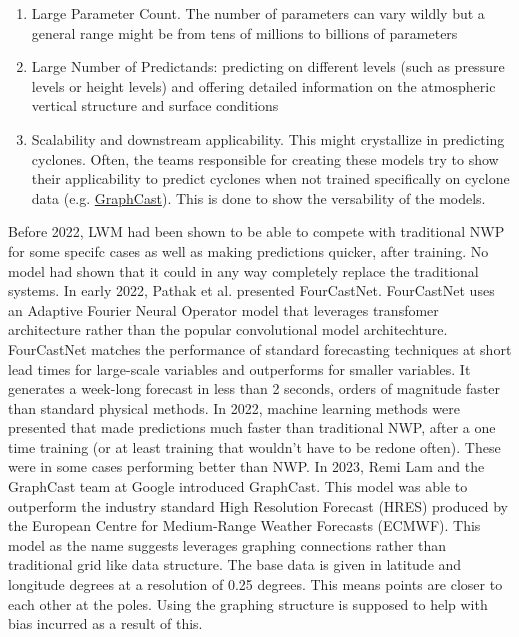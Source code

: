 \begin{enumerate}[label = Rule \arabic*:]
    \item Large Parameter Count. The number of parameters can vary wildly but a general range might be from tens of millions to billions of parameters
    \item Large Number of Predictands: predicting on different levels (such as pressure levels or height levels) and offering detailed information on the atmospheric vertical structure and surface conditions
    \item Scalability and downstream applicability. This might crystallize in predicting cyclones. Often, the teams responsible for creating these models try to show their applicability to predict cyclones when not trained specifically on cyclone data (e.g.  \href{https://www.youtube.com/watch?v=PD1v5PCJs_o&ab_channel=GregBronevetsky}{GraphCast})\cite{SecondRevolution}. This is done to show the versability of the models.
\end{enumerate}
Before 2022, LWM had been shown to be able to compete with traditional NWP for some specifc cases as well as making predictions quicker, after training. No model had shown that it could in any way completely replace the traditional systems. In early 2022, Pathak et al. presented FourCastNet. FourCastNet uses an Adaptive Fourier Neural Operator model that leverages transfomer architecture rather than the popular convolutional model architechture. FourCastNet matches the performance of standard forecasting techniques at short lead times for large-scale variables and outperforms for smaller variables. It generates a week-long forecast in less than 2 seconds, orders of magnitude faster than standard physical methods\cite{FourCastNet}. In 2022, machine learning methods were presented that made predictions much faster than traditional NWP, after a one time training (or at least training that wouldn't have to be redone often). These were in some cases performing better than NWP.  In 2023, Remi Lam and the GraphCast team at Google introduced GraphCast. This model was able to outperform the industry standard High Resolution Forecast (HRES) produced by the European Centre for Medium-Range Weather Forecasts (ECMWF). This model as the name suggests leverages graphing connections rather than traditional grid like data structure. The base data is given in latitude and longitude degrees at a resolution of 0.25 degrees. This means points are closer to each other at the poles. Using the graphing structure is supposed to help with bias incurred as a result of this\cite{GraphCast}.

